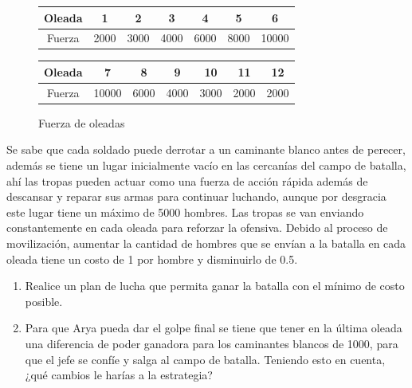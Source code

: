 \documentclass[a4paper,10pt,twocolumn]{article}
\theoremstyle{theorem}
\theoremstyle{definition}
\theoremstyle{remark}
\begin{document}
\begin{figure}[h!]%
	\begin{center}
		\begin{tabular}{|c|c|c|c|c|c|c|} \hline
		Oleada	& 1		& 2		& 3	    & 4		& 5		& 6		\\ \hline
		Fuerza	& 2000	& 3000	& 4000	& 6000	& 8000	& 10000	\\ \hline
		\end{tabular}
		
		\begin{tabular}{|c|c|c|c|c|c|c|} \hline
		Oleada	& 7		& 8		& 9	    & 10	& 11	& 12	\\ \hline
		Fuerza	& 10000	& 6000	& 4000	& 3000	& 2000	& 2000	\\ \hline
		\end{tabular}
	\caption{Fuerza de oleadas}\label{fig:ejer_5_1}
	\end{center}
\end{figure}

Se sabe que cada soldado puede derrotar a un caminante blanco antes de perecer, además se tiene un lugar inicialmente vacío en las cercanías del campo de batalla, ahí las tropas pueden actuar como una fuerza de acción rápida además de descansar y reparar sus armas para continuar luchando, aunque por desgracia este lugar tiene un máximo de 5000 hombres. Las tropas se van enviando constantemente en cada oleada para reforzar la ofensiva. Debido al proceso de movilización, aumentar la cantidad de hombres que se envían a la batalla en cada oleada tiene un costo de 1 por hombre y disminuirlo de 0.5.

\renewcommand{\theenumi}{\alph{enumi}} %

\begin{enumerate}

	\item Realice un plan de lucha que permita ganar la batalla con el mínimo de costo posible.
	\item Para que Arya pueda dar el golpe final se tiene que tener en la última oleada una diferencia de poder ganadora para los caminantes 
	blancos de 1000, para que el jefe se confíe y salga al campo de batalla. Teniendo esto en cuenta, ¿qué cambios le harías a la estrategia?

\end{enumerate}

\end{document}
